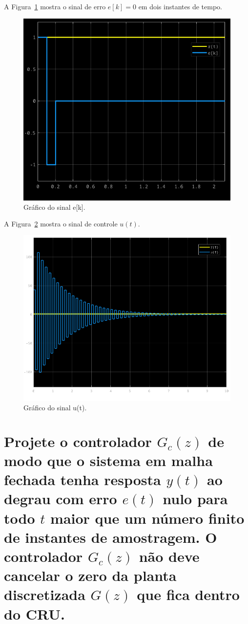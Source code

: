\documentclass{article}
\begin{document}
        {A Figura~\ref{fig:q2_simulink_e} mostra o sinal de erro $e[k] = 0$ em
        dois instantes de tempo.}

        \begin{figure}[H]
           \centering
                \includegraphics[width=.6\linewidth]{images/q2_e_k.png}
                \caption{Gráfico do sinal e[k].}
                \label{fig:q2_simulink_e}
        \end{figure}

        {A Figura~\ref{fig:q2_simulink_u} mostra o sinal de controle $u(t)$.}

        \begin{figure}[H]
           \centering
                \includegraphics[width=.6\linewidth]{images/q2_u_t.png}
                \caption{Gráfico do sinal u(t).}
                \label{fig:q2_simulink_u}
        \end{figure}


    \section{\normalsize{\normalfont Projete o controlador $G_c(z)$ de modo que
    o sistema em malha fechada tenha resposta $y(t)$ ao degrau com erro $e(t)$
    nulo para todo $t$ maior que um número finito de instantes de amostragem.
    O controlador $G_c(z)$ não deve cancelar o zero da planta discretizada
    $G(z)$ que fica dentro do CRU.}}
\end{document}
